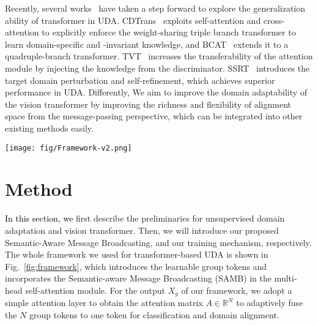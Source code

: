 \documentclass[journal]{IEEEtran}
\newcommand{\tco}{\textcolor{black}}
\begin{document}
Recently, several works~\cite{xu2021cdtransCDTrans, ma2021exploitingWinTR, yang2021tvtTVT, sun2022safeSSRT, hoyer2022daformerDAformer} have taken a step forward to explore the generalization ability of transformer in UDA. CDTrans~\cite{xu2021cdtransCDTrans} exploits self-attention and cross-attention to explicitly enforce the weight-sharing triple branch transformer to learn domain-specific and -invariant knowledge, and BCAT~\cite{wang2022domainBCAT} extends it to a quadruple-branch transformer. TVT~\cite{yang2021tvtTVT} increases the transferability of  the attention module 
by injecting the knowledge from the discriminator. SSRT~\cite{sun2022safeSSRT} introduces the target domain perturbation and self-refinement, which achieves superior performance in UDA. Differently, 
We aim to improve the domain adaptability of the vision transformer by improving
the richness and flexibility of alignment space from the message-passing perspective, which can be integrated into other existing methods easily.



\begin{figure*}[htp]
    \centering
    \texttt{[image: fig/Framework-v2.png]}
    \caption{The framework of ViT by incorporating our proposed Semantic-aware Message Broadcasting (SAMB). $X_g$ and $X_p$ are the group tokens and image tokens, respectively. $Q$, $K$, $V$ represent the query, key, and value projected with weights $W_q$, $W_k$, $W_v$.  We implement SAMB with our carefully designed attention mask $\mathcal{M}$, $\mathcal{M}_g$. Here, $\mathcal{M}$ is adaptively generated with the Gumbel softmax~\cite{jang2016categoricalGumbelsoftmax} based on the correlation between the semantics/contents of image tokens and group tokens. We adopt a simple attention layer to obtain the attention matrix $A\in \mathbb{R^{N}}$ to fuse the $N$ group tokens to a token and conduct the classification and domain alignment on this token.}
    \label{fig:framework}
\end{figure*}


\section{Method}
\label{sec:methods}
\tco{In this section, we} first describe the preliminaries for unsupervised domain adaptation and vision transformer. Then, we will introduce our proposed Semantic-Aware Message Broadcasting, and our  training mechanism, respectively. The whole framework we used for transformer-based UDA is shown in Fig.~\ref{fig:framework}, which introduces the learnable group tokens and incorporates the Semantic-aware Message Broadcasting (SAMB) in the multi-head self-attention module. For the output $X_g$ of our framework, we adopt a simple attention layer to obtain the attention matrix $A\in \mathbb{R}^N$ to adaptively fuse the $N$ group tokens to one token for classification and domain alignment. 
\end{document}
